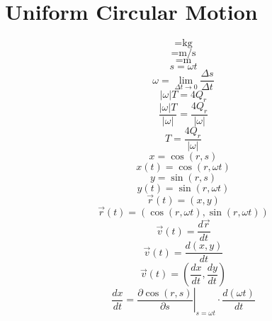 \documentclass[a4paper,12pt]{report}
\begin{document}
\section*{Uniform Circular Motion}
\begin{equation}
[m] = \text{kg}
\end{equation}
\begin{equation}
[\omega] = \text{m/s}
\end{equation}
\begin{equation}
[r] = \text{m}
\end{equation}
\begin{equation}
s = \omega t
\end{equation}
\begin{equation}
\omega = \lim \limits_{\Delta t \to 0} \frac{\Delta s}{\Delta t}
\end{equation}
\begin{equation}
|\omega| T = 4Q_r
\end{equation}
\begin{equation}
\frac{|\omega| T}{|\omega|} = \frac{4Q_r}{|\omega|}
\end{equation}
\begin{equation}
T = \frac{4Q_r}{|\omega|}
\end{equation}
\begin{equation}
x = \cos(r,s)
\end{equation}
\begin{equation}
x(t) = \cos(r,\omega t)
\end{equation}
\begin{equation}
y = \sin(r,s)
\end{equation}
\begin{equation}
y(t) = \sin(r,\omega t)
\end{equation}
\begin{equation}
\vec{r}(t) = (x,y)
\end{equation}
\begin{equation}
\vec{r}(t) = (\cos(r,\omega t),\sin(r,\omega t))
\end{equation}
\begin{equation}
\vec{v}(t) = \frac{d \vec{r}}{dt}
\end{equation}
\begin{equation}
\vec{v}(t) = \frac{d (x,y)}{dt}
\end{equation}
\begin{equation}
\vec{v}(t) = \left(\frac{dx}{dt},\frac{dy}{dt}\right)
\end{equation}
\begin{equation}
\frac{dx}{dt} = \left.\frac{\partial \cos(r,s)}{\partial s}\right|_{s = \omega t} \cdot \frac{d (\omega t)}{dt}
\end{equation}
\end{document}
